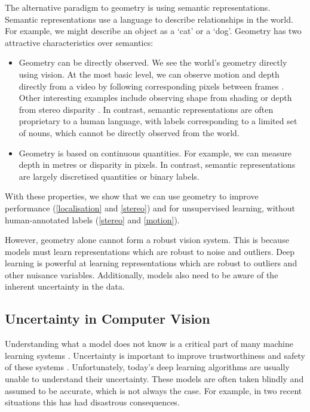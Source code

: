 The alternative paradigm to geometry is using semantic representations. 
Semantic representations use a language to describe relationships in the world. For example, we might describe an object as a `cat' or a `dog'.
Geometry has two attractive characteristics over semantics:
\begin{itemize}
\item Geometry can be directly observed. We see the world's geometry directly using vision.  At the most basic level, we can observe motion and depth directly from a video by following corresponding pixels between frames \citep{koenderink1991affine}.  Other interesting examples include observing shape from shading \citep{horn1989shape} or depth from stereo disparity \citep{scharstein2002taxonomy}. In contrast, semantic representations are often proprietary to a human language, with labels corresponding to a limited set of nouns, which cannot be directly observed from the world.
\item Geometry is based on continuous quantities. For example, we can measure depth in metres or disparity in pixels. In contrast, semantic representations are largely discretised quantities or binary labels.
\end{itemize}
With these properties, we show that we can use geometry to improve performance (\cref{localisation} and \cref{stereo}) and for unsupervised learning, without human-annotated labels (\cref{stereo} and \cref{motion}).

However, geometry alone cannot form a robust vision system. This is because models must learn representations which are robust to noise and outliers. Deep learning is powerful at learning representations which are robust to outliers and other nuisance variables. Additionally, models also need to be aware of the inherent uncertainty in the data.

\subsection{Uncertainty in Computer Vision}

Understanding what a model does not know is a critical part of many machine learning systems \citep{ghahramani2015probabilistic}. Uncertainty is important to improve trustworthiness and safety of these systems \citep{mcallister2017av_bdl}. Unfortunately, today's deep learning algorithms are usually unable to understand their uncertainty. These models are often taken blindly and assumed to be accurate, which is not always the case. For example, in two recent situations this has had disastrous consequences.

